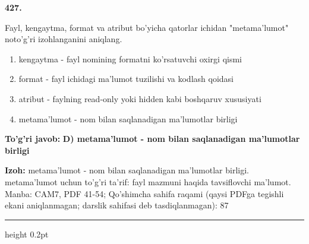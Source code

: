 \documentclass[10pt,a4paper]{article}
\begin{document}
{\bfseries\sffamily\color{ink} 427.}
\par
Fayl, kengaytma, format va atribut bo'yicha qatorlar ichidan "metama'lumot" noto'g'ri izohlanganini aniqlang.
\begin{enumerate}[label=\Alph*),leftmargin=9mm]
\item kengaytma - fayl nomining formatni ko'rsatuvchi oxirgi qismi
\item format - fayl ichidagi ma'lumot tuzilishi va kodlash qoidasi
\item atribut - faylning read-only yoki hidden kabi boshqaruv xususiyati
\item metama'lumot - nom bilan saqlanadigan ma'lumotlar birligi
\end{enumerate}
\begin{tcolorbox}[enhanced,breakable,colback=teal!4,colframe=teal!60!black,boxrule=0.45pt,arc=1.2mm,left=2.7mm,right=2.7mm,top=1.8mm,bottom=1.8mm,before skip=2mm,after skip=2mm]
{\bfseries\sffamily\color{teal}To'g'ri javob:} \textbf{D) metama'lumot - nom bilan saqlanadigan ma'lumotlar birligi}
\par\smallskip
{\bfseries Izoh:} metama'lumot - nom bilan saqlanadigan ma'lumotlar birligi. metama'lumot uchun to'g'ri ta'rif: fayl mazmuni haqida tavsiflovchi ma'lumot. Manba: CAM7, PDF 41-54; Qo'shimcha sahifa raqami (qaysi PDFga tegishli ekani aniqlanmagan; darslik sahifasi deb tasdiqlanmagan): 87
\end{tcolorbox}
\vspace{2mm}\hrule height 0.2pt\vspace{3mm}
\end{document}
